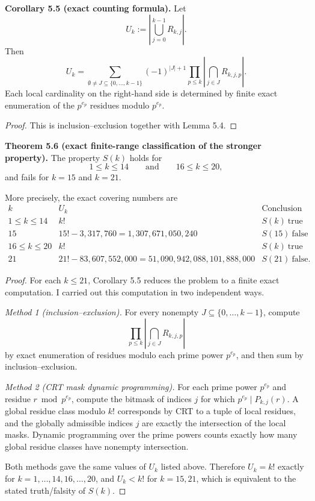 \medskip
\noindent
\textbf{Corollary 5.5 (exact counting formula).}
Let
\[
U_k:=\left|\bigcup_{j=0}^{k-1} R_{k,j}\right|.
\]
Then
\[
U_k
=
\sum_{\emptyset\ne J\subseteq \{0,\dots,k-1\}}
(-1)^{|J|+1}
\prod_{p\le k}
\left|
\bigcap_{j\in J} R_{k,j,p}
\right|.
\]
Each local cardinality on the right-hand side is determined by finite exact enumeration of the \(p^{e_p}\) residues modulo \(p^{e_p}\).

\begin{proof}
This is inclusion--exclusion together with Lemma 5.4.
\end{proof}

\medskip
\noindent
\textbf{Theorem 5.6 (exact finite-range classification of the stronger property).}
The property \(S(k)\) holds for
\[
1\le k\le 14
\qquad\mbox{and}\qquad
16\le k\le 20,
\]
and fails for \(k=15\) and \(k=21\).

More precisely, the exact covering numbers are
\[
\begin{array}{c|c|c}
k & U_k & \mbox{Conclusion}\\
\hline
1\le k\le 14 & k! & S(k)\ \mbox{true}\\
15 & 15!-3{,}317{,}760 = 1{,}307{,}671{,}050{,}240 & S(15)\ \mbox{false}\\
16\le k\le 20 & k! & S(k)\ \mbox{true}\\
21 & 21!-83{,}607{,}552{,}000 = 51{,}090{,}942{,}088{,}101{,}888{,}000 & S(21)\ \mbox{false.}
\end{array}
\]

\begin{proof}
For each \(k\le 21\), Corollary 5.5 reduces the problem to a finite exact computation.  I carried out this computation in two independent ways.

\medskip
\noindent
\emph{Method 1 (inclusion--exclusion).}
For every nonempty \(J\subseteq\{0,\dots,k-1\}\), compute
\[
\prod_{p\le k}
\left|
\bigcap_{j\in J} R_{k,j,p}
\right|
\]
by exact enumeration of residues modulo each prime power \(p^{e_p}\), and then sum by inclusion--exclusion.

\medskip
\noindent
\emph{Method 2 (CRT mask dynamic programming).}
For each prime power \(p^{e_p}\) and residue \(r\bmod p^{e_p}\), compute the bitmask of indices \(j\) for which \(p^{e_p}\mid P_{k,j}(r)\).  A global residue class modulo \(k!\) corresponds by CRT to a tuple of local residues, and the globally admissible indices \(j\) are exactly the intersection of the local masks.  Dynamic programming over the prime powers counts exactly how many global residue classes have nonempty intersection.

\medskip
Both methods gave the same values of \(U_k\) listed above.  Therefore \(U_k=k!\) exactly for \(k=1,\dots,14,16,\dots,20\), and \(U_k<k!\) for \(k=15,21\), which is equivalent to the stated truth/falsity of \(S(k)\).
\end{proof}

